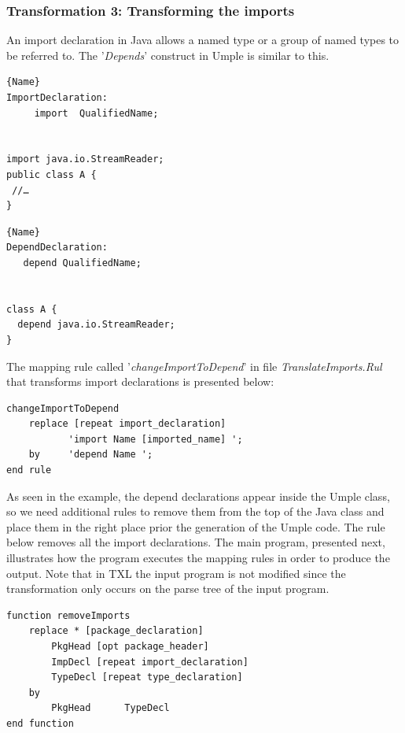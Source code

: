 \subsubsection{Transformation 3: Transforming the imports} 

An import declaration in Java allows a named type or a group of named types to be referred to. The '\textit{Depends}' construct in Umple is similar to this. 

\noindent\begin{minipage}{.45\textwidth}
\begin{lstlisting}[style=umplePlain,caption=Java Import]{Name}
ImportDeclaration:
     import  QualifiedName; 


import java.io.StreamReader;
public class A {
 //…
}
\end{lstlisting}
\end{minipage}\hfill
\begin{minipage}{.45\textwidth}
\begin{lstlisting}[style=umplePlain,caption=Umple Depend]{Name}
DependDeclaration:
   depend QualifiedName;


class A {
  depend java.io.StreamReader;
}
\end{lstlisting}
\end{minipage}

The mapping rule called '\textit{changeImportToDepend}' in file \textit{TranslateImports.Rul} that transforms import declarations is presented below: 

\begin{lstlisting}[style=umplePlain, label=lst:packageDeclRule, caption=TXL mapping rule for the transformation of the import declaration] 
changeImportToDepend  	
    replace [repeat import_declaration]      
           'import Name [imported_name] '; 
    by 	   'depend Name '; 
end rule
\end{lstlisting}

As seen in the example, the depend declarations appear inside the Umple class, so we need additional rules to remove them from the top of the Java class and place them in the right place prior the generation of the Umple code. The rule below removes all the import declarations. The main program, presented next, illustrates how the program executes the mapping rules in order to produce the output. Note that in TXL the input program is not modified since the transformation only occurs on the parse tree of the input program.

\begin{lstlisting}[style=umplePlain, label=lst:packageDeclRule2, caption=Helper Function used to remove the imports declarations] 
function removeImports  
    replace * [package_declaration]
        PkgHead [opt package_header]   
        ImpDecl [repeat import_declaration]  
        TypeDecl [repeat type_declaration] 
    by   
        PkgHead      TypeDecl
end function
\end{lstlisting}


